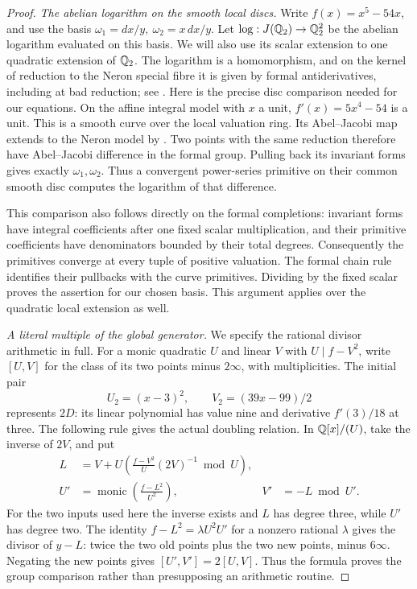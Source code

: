 \begin{proof}
\emph{The abelian logarithm on the smooth local discs.}
Write \(f(x)=x^5-54x\), and use the basis
\(\omega_1=dx/y,\ \omega_2=x\,dx/y\).
Let \(\log:J(\mathbb Q_2)\to\mathbb Q_2^2\) be the abelian
logarithm evaluated on this basis.  We will also use
its scalar extension to one quadratic extension of
\(\mathbb Q_2\).  The logarithm is a homomorphism, and
on the kernel of reduction to the Neron special fibre
it is given by formal antiderivatives, including at
bad reduction; see
\cite[\S4.1, Remark 4.1, author version p.4]{LegMcCallumPoonenChabauty}.
Here is the precise disc comparison needed for our
equations.  On the affine integral model with \(x\)
a unit, \(f'(x)=5x^4-54\) is a unit.  This is a
smooth curve over the local valuation ring.  Its
Abel--Jacobi map extends to the Neron model by
\cite[Theorem 5.7.25 and Proposition 5.7.26, p.143]{LegPoonenRationalPoints}.
Two points with the same reduction therefore have
Abel--Jacobi difference in the formal group.  Pulling
back its invariant forms gives exactly
\(\omega_1,\omega_2\).  Thus a convergent power-series
primitive on their common smooth disc computes the
logarithm of that difference.

This comparison also follows directly on the formal
completions: invariant forms have integral coefficients
after one fixed scalar multiplication, and their
primitive coefficients have denominators bounded by
their total degrees.  Consequently the primitives
converge at every tuple of positive valuation.  The
formal chain rule identifies their pullbacks with the
curve primitives.  Dividing by the fixed scalar proves
the assertion for our chosen basis.  This argument
applies over the quadratic local extension as well.

\emph{A literal multiple of the global generator.}
We specify the rational divisor arithmetic in full.
For a monic quadratic \(U\) and linear \(V\) with
\(U\mid f-V^2\), write \([U,V]\) for the class
of its two points minus \(2\infty\), with
multiplicities.  The initial pair
\[
 U_2=(x-3)^2,\qquad V_2=(39x-99)/2
\tag{A.189.6}
\]
represents \(2D\): its linear polynomial has value
nine and derivative \(f'(3)/18\) at three.
The following rule gives the actual doubling relation.
In \(\mathbb Q[x]/(U)\), take the inverse of \(2V\), and put
\[
\begin{aligned}
 L&=V+U\left(\frac{f-V^2}{U}(2V)^{-1}\bmod U\right),\\
 U'&=\operatorname{monic}\left(\frac{f-L^2}{U^2}\right),
       &V'&=-L\bmod U'.
\end{aligned}
\tag{A.189.7}
\]
For the two inputs used here the inverse exists and
\(L\) has degree three, while \(U'\) has degree two.
The identity \(f-L^2=\lambda U^2U'\) for a
nonzero rational \(\lambda\) gives the divisor
of \(y-L\): twice the two old points plus the
two new points, minus \(6\infty\).  Negating the
new points gives \([U',V']=2[U,V]\).
Thus the formula proves the group comparison rather
than presupposing an arithmetic routine.


\end{proof}
